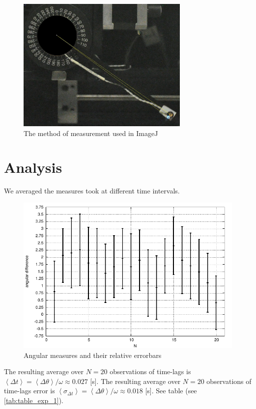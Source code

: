 \documentclass[a4paper]{article}  %
\begin{document}
\begin{figure}[htb!]
\centering
\includegraphics[width=0.75\textwidth]{images/measurement_method.jpg}
\caption{The method of measurement used in ImageJ}
\end{figure}
\clearpage

\section{Analysis}
We averaged the measures took at different time intervals.

\begin{figure}[htb!]
\centering
\includegraphics[width=1.0\textwidth]{data/angles_test_1.pdf}
\caption{Angular measures and their relative errorbars}
\end{figure}

The resulting average over $N=20$ observations of time-lags is $\left < \Delta t \right > = \left < \Delta \theta \right >/\omega \approx 0.027$ [s]. 
The resulting average over $N=20$ observations of time-lags error is $\left < \sigma_{\Delta t} \right > = \left < \Delta \theta \right >/\omega \approx 0.018$ [s]. 
See table (see \ref{tab:table_exp_1}).
\end{document}
